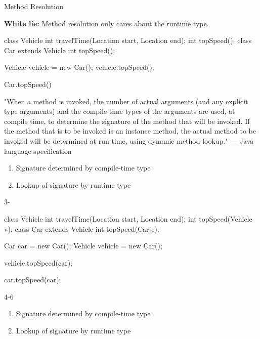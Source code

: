\documentclass[week7]{csse2002}
\begin{document}
\begin{topic}{Method Resolution}
\begin{subtopic}{1}
\textbf{White lie: } Method resolution only cares about the runtime type.

\begin{java}
class Vehicle {
	int travelTime(Location start, Location end);
	int topSpeed();
}
class Car extends Vehicle {
	int topSpeed();
}

Vehicle vehicle = new Car();
vehicle.topSpeed();
\end{java}

Car.topSpeed()
\end{subtopic}

\begin{subtopic}{2}
"When a method is invoked, the number of actual arguments (and any explicit type arguments) and the compile-time types of the arguments are used, at compile time, to determine the signature of the method that will be invoked. If the method that is to be invoked is an instance method, the actual method to be invoked will be determined at run time, using dynamic method lookup." --- Java language specification

\begin{enumerate}
	\item Signature determined by compile-time type
	\item Lookup of signature by runtime type
\end{enumerate}
\end{subtopic}

\begin{subtopic}{3-}
\begin{java}
class Vehicle {
	int travelTime(Location start, Location end);
	int topSpeed(Vehicle v);
}
class Car extends Vehicle {
	int topSpeed(Car c);
}

Car car = new Car();
Vehicle vehicle = new Car();

vehicle.topSpeed(car);

car.topSpeed(car);
\end{java}
\end{subtopic}

\begin{subtopic}{4-6}
\begin{enumerate}
	\item Signature determined by compile-time type
	\item Lookup of signature by runtime type
\end{enumerate}
\end{subtopic}


\end{topic}
\end{document}

